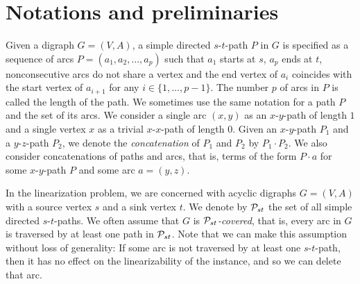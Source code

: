 \section{Notations  and preliminaries}\label{defi:sec}

 Given a digraph $G=(V,A)$, a simple directed $s$-$t$-path $P$ in $G$ is specified as a sequence of
arcs $P=(a_1,a_2,\ldots,a_p)$ such that  $a_1$ starts at $s$, $a_p$
ends at $t$, nonconsecutive arcs do not share a vertex and  the end vertex of $a_{i}$ coincides with  the start vertex of $a_{i+1}$ for any $i\in \{1,\ldots,p-1\}$. The number
$p$ of arcs in $P$ is called the length of the path. We sometimes use the same notation for a path $P$ and the  set of its arcs. 
We  consider a single arc $(x, y)$ as an $x$-$y$-path of length $1$  and a single vertex $x$ as a  trivial $x$-$x$-path of length $0$. Given an  $x$-$y$-path $P_1$ and a  $y$-$z$-path $P_2$, we denote the \emph{concatenation} of $P_1$ and $P_2$ by $P_1 \cdot P_2$. We also consider concatenations of paths and arcs, that is, terms of the form $P \cdot a$ for some $x$-$y$-path $P$ and some arc $a = (y, z)$.
 
In the linearization problem, we are concerned with acyclic digraphs $G =(V, A)$ with a source vertex $s$ and a sink vertex $t$. 
We denote by  $\mathcal{P}_{st}$ the set of all simple directed $s$-$t$-paths.
We often assume that $G$ is \emph{$\mathcal{P}_{st}$-covered}, that is, every arc in $G$ is traversed by at least one path in $\mathcal{P}_{st}$. 
Note that we can make this assumption without loss of generality: If some arc is not traversed by at least one $s$-$t$-path, then it has no effect on the linearizability of the instance, and so we can delete that arc.

